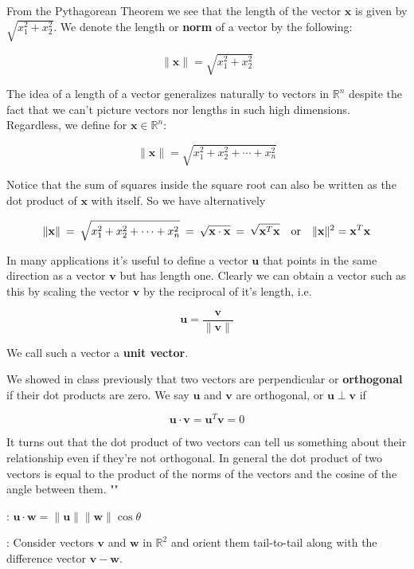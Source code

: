 \documentclass[12pt]{article}
\newcommand{\hs}{\hspace{.75mm}}
\newcommand{\nin}{\noindent}
\newcommand{\vthree}{\vspace{3mm}}
\newcommand{\R}[1]{\mathbb{R}^{#1}}
\newcommand{\bw}{\mathbf{w}}
\newcommand{\bx}{\mathbf{x}}
\newcommand{\bv}{\mathbf{v}}
\newcommand{\bu}{\mathbf{u}}
\begin{document}
\vthree

\nin From the Pythagorean Theorem we see that the length of the vector $\bx$ is given by $\sqrt{x_1^2 + x_2^2}$.  We denote the length or {\bf norm} of a vector by the following:

\[
\|\bx\| = \sqrt{x_1^2 + x_2^2}
\]

\vthree

\nin The idea of a length of a vector generalizes naturally to vectors in $\R{n}$ despite the fact that we can't picture vectors nor lengths in such high dimensions.  Regardless, we define for $\bx \in \R{n}$:


\[
\|\bx\| = \sqrt{x_1^2 + x_2^2 + \cdots + x_n^2}
\]

\vthree

\nin Notice that the sum of squares inside the square root can also be written as the dot product of $\bx$ with itself.  So we have alternatively

\[
\|\bx\| \hs=\hs \sqrt{x_1^2 + x_2^2 + \cdots + x_n^2} \hs=\hs \sqrt{\bx \cdot \bx} \hs=\hs \sqrt{\bx^T\bx}
\quad \textrm{or} \quad
\|\bx\|^2 = \bx^T\bx
\]

\clearpage

\nin In many applications it's useful to define a vector $\bu$ that points in the same direction as a vector $\bv$ but has length one.   Clearly we can obtain a vector such as this by scaling the vector $\bv$ by the reciprocal of it's length, i.e.

\[
\bu = \frac{\bv}{\|\bv\|}
\]

\nin We call such a vector a {\bf unit vector}.

\vthree

\nin We showed in class previously that two vectors are perpendicular or {\bf orthogonal} if their dot products are zero.  We say $\bu$ and $\bv$ are orthogonal, or $\bu \perp \bv$ if

\[
\bu \cdot \bv = \bu^T \bv = 0
\]

\nin It turns out that the dot product of two vectors can tell us something about their relationship even if they're not orthogonal.  In general the dot product of two vectors is equal to the product of the norms of the vectors and the cosine of the angle between them.
""
\vthree

\nin {\bf Fact}: $\bu \cdot \bw = \|\bu\|\|\bw\| \cos \theta$

\vthree

\nin {\bf Geometric Proof}: Consider vectors $\bv$ and $\bw$ in $\R{2}$ and orient them tail-to-tail along with the difference vector $\bv- \bw$.
\end{document}
